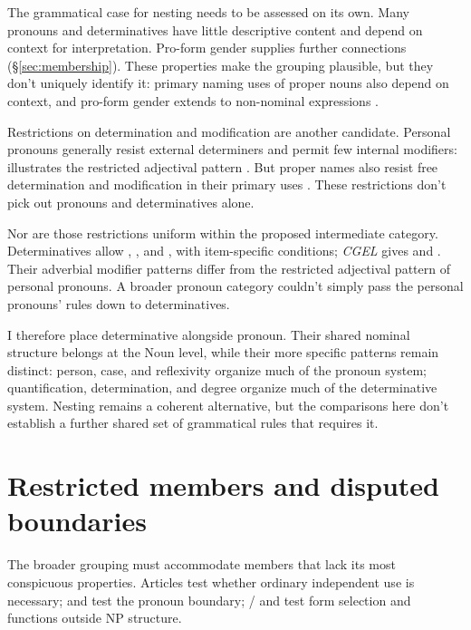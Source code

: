 \documentclass[12pt]{article}
\begin{document}
The grammatical case for nesting needs to be assessed on its own. Many pronouns and determinatives have little descriptive content and depend on context for interpretation. Pro-form gender supplies further connections (§\ref{sec:membership}). These properties make the grouping plausible, but they don't uniquely identify it: primary naming uses of proper nouns also depend on context, and pro-form gender extends to non-nominal expressions \citep{reynolds2025proformgender}.

Restrictions on determination and modification are another candidate. Personal pronouns generally resist external determiners and permit few internal modifiers:  illustrates the restricted adjectival pattern \citep[429--430]{huddleston2002}. But proper names also resist free determination and modification in their primary uses \citep[517, 519--520]{huddleston2002}. These restrictions don't pick out pronouns and determinatives alone.

Nor are those restrictions uniform within the proposed intermediate category. Determinatives allow , , and , with item-specific conditions; \textit{CGEL} gives  and  \citep[415--416]{huddleston2002}. Their adverbial modifier patterns differ from the restricted adjectival pattern of personal pronouns. A broader pronoun category couldn't simply pass the personal pronouns' rules down to determinatives.

I therefore place determinative alongside pronoun. Their shared nominal structure belongs at the Noun level, while their more specific patterns remain distinct: person, case, and reflexivity organize much of the pronoun system; quantification, determination, and degree organize much of the determinative system. Nesting remains a coherent alternative, but the comparisons here don't establish a further shared set of grammatical rules that requires it.

\section{Restricted members and disputed boundaries}\label{sec:articles}

The broader grouping must accommodate members that lack its most conspicuous properties. Articles test whether ordinary independent use is necessary;  and  test the pronoun boundary; / and  test form selection and functions outside NP structure.
\end{document}
